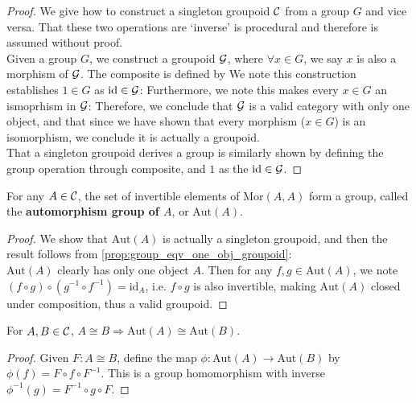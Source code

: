 \begin{proof}
    We give how to construct a singleton groupoid $\mathcal{C}$ from a group $G$ and vice versa. That these two operations are `inverse' is procedural and therefore is assumed without proof.\\ 
    Given a group $G$, we construct a groupoid $\mathcal{G}$, where $\forall x \in G$, we say $x$ is also a morphism of $\mathcal{G}$. The composite is defined by
    We note this construction establishes $1 \in G$ as $\text{id} \in \mathcal{G}$:
    Furthermore, we note this makes every $x \in G$ an ismoprhism in $\mathcal{G}$:
    Therefore, we conclude that $\mathcal{G}$ is a valid category with only one object, and that since we have shown that every morphism ($x \in G$) is an isomorphism, we conclude it is actually a groupoid.\\
    That a singleton groupoid derives a group is similarly shown by defining the group operation through composite, and $1$ as the $\text{id} \in \mathcal{G}$.
    \leanokcomplex
\end{proof}

\begin{proposition}[FoAG 1.1.B(1)]
    \label{prop:aut_is_group}
    For any $A \in \mathcal{C}$, the set of invertible elements of $\text{Mor}(A,A)$ form a group, called the \textbf{automorphism group of $A$}, or $\text{Aut}(A)$.
\end{proposition}

\begin{proof}
    We show that $\text{Aut}(A)$ is actually a singleton groupoid, and then the result follows from \ref{prop:group_eqv_one_obj_groupoid}:\\
    $\text{Aut}(A)$ clearly has only one object $A$. Then for any $f, g \in \text{Aut}(A)$, we note $(f \circ g) \circ (g^{-1} \circ f^{-1}) = \text{id}_A$, i.e. $f\circ g$ is also invertible, making $\text{Aut}(A)$ closed under composition, thus a valid groupoid.
\end{proof}

\begin{proposition}[FoAG 1.1.B(2)]
    \label{prop:aut_iso_of_iso}
    For $A, B \in \mathcal{C}$, $A \cong B \Rightarrow \text{Aut}(A) \cong \text{Aut}(B)$.
\end{proposition}

\begin{proof}
    Given $F : A \cong B$, define the map $\phi: \text{Aut}(A) \to \text{Aut}(B)$ by $\phi(f) = F \circ f \circ F^{-1}$. This is a group homomorphism with inverse $\phi^{-1}(g) = F^{-1} \circ g \circ F$.
\end{proof}